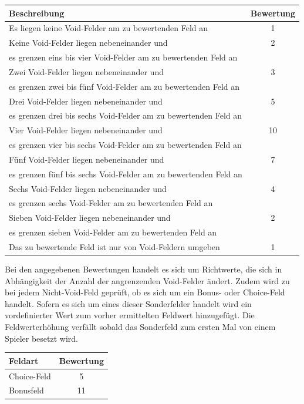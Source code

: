 \documentclass[12pt,a4paper]{article}
\begin{document}
\begin{tabular}{|l|c|}
	\hline
	Beschreibung & Bewertung\\
	\hline
	Es liegen keine Void-Felder am zu bewertenden Feld an & 1\\
	\hline
	Keine Void-Felder liegen nebeneinander und & 2\\
	es grenzen eins bis vier Void-Felder am zu bewertenden Feld an &\\
	\hline
	Zwei Void-Felder liegen nebeneinander und & 3\\
	es grenzen zwei bis fünf Void-Felder am zu bewertenden Feld an &\\
	\hline
	Drei Void-Felder liegen nebeneinander und & 5\\
	es grenzen drei bis sechs Void-Felder am zu bewertenden Feld an &\\
	\hline
	Vier Void-Felder liegen nebeneinander und & 10\\
	es grenzen vier bis sechs Void-Felder am zu bewertenden Feld an &\\
	\hline
	Fünf Void-Felder liegen nebeneinander und & 7\\
	es grenzen fünf bis sechs Void-Felder am zu bewertenden Feld an &\\
	\hline
	Sechs Void-Felder liegen nebeneinander und & 4\\
	es grenzen sechs Void-Felder am zu bewertenden Feld an &\\
	\hline
	Sieben Void-Felder liegen nebeneinander und & 2\\
	es grenzen sieben Void-Felder am zu bewertenden Feld an &\\
	\hline
	Das zu bewertende Feld ist nur von Void-Feldern umgeben & 1\\
	\hline
\end{tabular}

Bei den angegebenen Bewertungen handelt es sich um Richtwerte, die sich in Abhängigkeit der Anzahl der angrenzenden Void-Felder ändert.\newline
Zudem wird zu bei jedem Nicht-Void-Feld geprüft, ob es sich um ein Bonus- oder Choice-Feld handelt. Sofern es sich um eines dieser Sonderfelder handelt wird ein vordefinierter Wert zum vorher ermittelten Feldwert hinzugefügt. Die Feldwerterhöhung verfällt sobald das Sonderfeld zum ersten Mal von einem Spieler besetzt wird.

\begin{tabular}{|l|c|}
	\hline
	Feldart & Bewertung\\
	\hline
	Choice-Feld & 5\\
	\hline
	Bonusfeld & 11\\
	\hline
\end{tabular}
\end{document}
